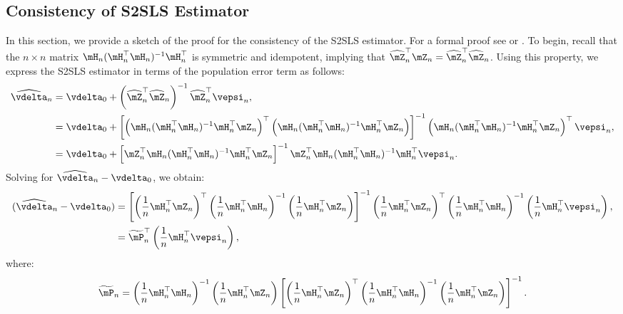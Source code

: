 \subsection{Consistency of S2SLS Estimator}

In this section, we provide a sketch of the proof for the consistency of the S2SLS estimator. For a formal proof see \cite{kelejian1998generalized} or \cite{kelejian2010specification}. To begin, recall that the $n\times n$ matrix  $\mH_n(\mH_n^\top\mH_n)^{-1}\mH_n^\top$ is symmetric and idempotent, implying that $\widehat{\mZ}_n^\top\mZ_n= \widehat{\mZ}_n^\top\widehat{\mZ}_n$. Using this property, we express the S2SLS estimator in terms of the population error term as follows: 
\begin{equation}\label{eq:sampling_error_s2sls}
  \begin{aligned}
     \widehat{\vdelta}_n & =  \vdelta_0 + \left(\widehat{\mZ}^\top_n\widehat{\mZ}_n\right)^{-1}\widehat{\mZ}^\top_n\vepsi_n, \\
     & = \vdelta_0 + \left[\left(\mH_n(\mH^\top_n\mH_n)^{-1}\mH^\top_n\mZ_n\right)^\top\left(\mH_n(\mH^\top_n\mH_n)^{-1}\mH^\top_n\mZ_n\right)\right]^{-1}\left(\mH_n(\mH^\top_n\mH_n)^{-1}\mH^\top_n\mZ_n\right)^\top\vepsi_n, \\
     & = \vdelta_0 + \left[\mZ^\top_n \mH_n (\mH^\top_n\mH_n)^{-1}\mH^\top_n\mZ_n\right]^{-1}\mZ^\top_n\mH_n(\mH^\top_n\mH_n)^{-1}\mH^\top_n\vepsi_n.
  \end{aligned}
\end{equation}
%
Solving for $\widehat{\vdelta}_{n} - \vdelta_0$, we obtain:
\begin{equation}\label{eq:asy_2sls_pr}
\begin{aligned}
(\widehat{\vdelta}_{n} - \vdelta_0) & = \left[\left(\frac{1}{n}\mH^\top_n\mZ _n\right)^\top\left(\frac{1}{n}\mH^\top_n\mH_n\right)^{-1}\left(\frac{1}{n}\mH^\top_n\mZ_n\right)\right]^{-1}\left(\frac{1}{n}\mH^\top_n\mZ_n\right)^\top\left(\frac{1}{n}\mH^\top_n\mH_n\right)^{-1}\left(\frac{1}{n}\mH^\top_n\vepsi_n\right), \\
             & = \widetilde{\mP}^\top_n\left(\frac{1}{n}\mH^\top_n\vepsi_n\right),
\end{aligned}
\end{equation}
where:
\begin{equation*}
  \widetilde{\mP}_n = \left(\frac{1}{n}\mH^\top_n\mH_n\right)^{-1}\left(\frac{1}{n}\mH_n^\top\mZ_n \right)\left[\left(\frac{1}{n}\mH^\top_n\mZ_n\right)^\top\left(\frac{1}{n}\mH^\top_n\mH_n\right)^{-1}\left(\frac{1}{n}\mH^\top_n\mZ_n\right)\right]^{-1}.
\end{equation*}

